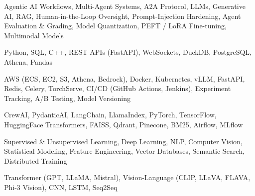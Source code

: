 \documentclass[letter,10pt]{article}
\begin{document}
 Agentic AI Workflows, Multi-Agent Systems, A2A Protocol, LLMs, Generative AI, RAG, Human-in-the-Loop Oversight, Prompt-Injection Hardening, Agent Evaluation \& Grading, Model Quantization, PEFT / LoRA Fine-tuning, Multimodal Models\par\vspace{2pt}

 Python, SQL, C++, REST APIs (FastAPI), WebSockets, DuckDB, PostgreSQL, Athena, Pandas\par\vspace{2pt}

 AWS (ECS, EC2, S3, Athena, Bedrock), Docker, Kubernetes, vLLM, FastAPI, Redis, Celery, TorchServe, CI/CD (GitHub Actions, Jenkins), Experiment Tracking, A/B Testing, Model Versioning\par\vspace{2pt}

 CrewAI, PydanticAI, LangChain, LlamaIndex, PyTorch, TensorFlow, HuggingFace Transformers, FAISS, Qdrant, Pinecone, BM25, Airflow, MLflow\par\vspace{2pt}

 Supervised \& Unsupervised Learning, Deep Learning, NLP, Computer Vision, Statistical Modeling, Feature Engineering, Vector Databases, Semantic Search, Distributed Training\par\vspace{2pt}

 Transformer (GPT, LLaMA, Mistral), Vision-Language (CLIP, LLaVA, FLAVA, Phi-3 Vision), CNN, LSTM, Seq2Seq
\end{document}

